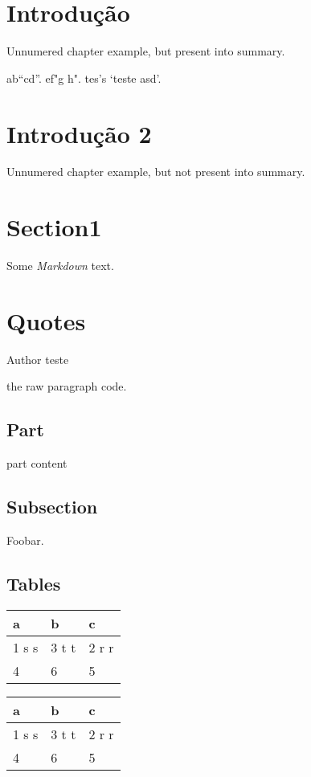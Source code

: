 \chapter*[Introdução]{Introdução}
Unnumered chapter example, but present into summary.

ab“cd”. ef"g h".
tes’s ‘teste asd’.

\chapter*[Introdução 2]{Introdução 2}
Unnumered chapter example, but not present into summary.

\chapter{Section1}
Some \emph{Markdown} text.

\chapter{Quotes}
\begin{squote}{Author}
teste
\end{squote}

the raw paragraph code.

\section{Part}
part content

\section{Subsection}
Foobar.

\section{Tables}
\begin{center}
\begin{tabular}{|l|l|l|}
\hline
\textbf{a} & \textbf{b} & \textbf{c} \\
\hline
1 s s & 3 t t & 2 r r \\ \hline
4 & 6 & 5 \\
\hline
\end{tabular}
\end{center}

\begin{center}
\begin{tabular}{l|l|l}
\textbf{a} & \textbf{b} & \textbf{c} \\
\hline
1 s s & 3 t t & 2 r r \\ \hline
4 & 6 & 5 \\
\end{tabular}
\end{center}

